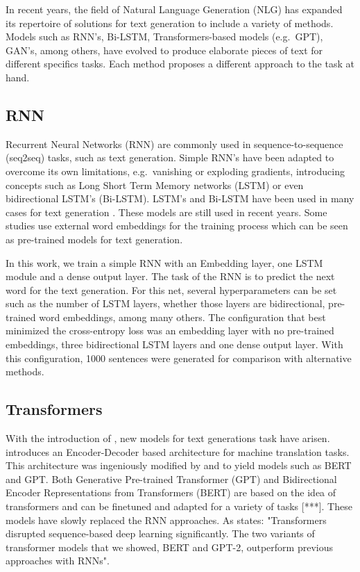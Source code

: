 \documentclass[10pt,twocolumn,letterpaper]{article}
\begin{document}
In recent years, the field of Natural Language Generation (NLG) has expanded its repertoire
of solutions for text generation to include a variety of methods.
Models such as RNN's, Bi-LSTM, Transformers-based models (e.g.\ GPT), GAN's, among others, have evolved
to produce elaborate pieces of text for different specifics tasks.
Each method proposes a different approach to the task at hand.

\subsection{RNN}

Recurrent Neural Networks (RNN) are commonly used in sequence-to-sequence (seq2seq) tasks, such as text generation.
Simple RNN's have been adapted to overcome its own limitations, e.g.\ vanishing or exploding gradients,
introducing concepts such as Long Short Term Memory networks (LSTM) or even bidirectional LSTM's (Bi-LSTM).
LSTM's and Bi-LSTM have been used in many cases for text generation \cite{Bengali} \cite{lstm1} \cite{lstm2} \cite{lstm3}.
These models are still used in recent years.
Some studies \cite{embedds} use external word embeddings for the training process which can be seen as pre-trained
models for text generation.

In this work, we train a simple RNN with an Embedding layer, one LSTM module and a dense output layer.
The task of the RNN is to predict the next word for the text generation.
For this net, several hyperparameters can be set such as the number of LSTM layers, whether those layers
are bidirectional, pre-trained word embeddings, among many others.
The configuration that best minimized the cross-entropy loss was an embedding layer with no pre-trained embeddings,
three bidirectional LSTM layers and one dense output layer.
With this configuration, 1000 sentences were generated for comparison with alternative methods.

\subsection{Transformers}

With the introduction of \cite{attention}, new models for text generations task have arisen.
\cite{attention} introduces an Encoder-Decoder based architecture for machine translation tasks.
This architecture was ingeniously modified by \cite{bert} and \cite{gpt} to yield models such as BERT and GPT.
Both Generative Pre-trained Transformer (GPT) and Bidirectional Encoder Representations from Transformers (BERT)
are based on the idea of transformers and can be finetuned and adapted for a variety of tasks [***].
These models have slowly replaced the RNN approaches.
As \cite{modernMethods} states: "Transformers disrupted sequence-based deep learning significantly.
The two variants of transformer models that we showed, BERT and GPT-2, outperform
previous approaches with RNNs".
\end{document}
